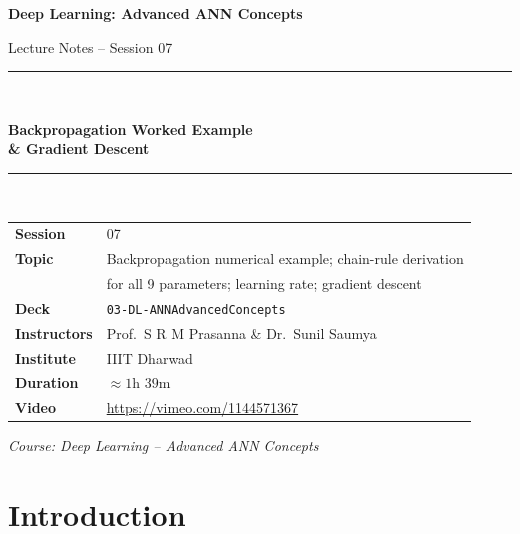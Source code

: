 \documentclass[12pt,a4paper]{article}
\begin{document}
\begin{titlepage}
  \centering
  \vspace*{2cm}
  {\LARGE\bfseries Deep Learning: Advanced ANN Concepts\par}
  \vspace{0.5cm}
  {\large Lecture Notes -- Session 07\par}
  \vspace{1.5cm}
  \rule{\linewidth}{0.5pt}\\[0.4cm]
  {\huge\bfseries Backpropagation Worked Example\\[0.3cm]
   \& Gradient Descent\par}
  \rule{\linewidth}{0.5pt}\\[1.5cm]

  \begin{tabular}{ll}
    \textbf{Session}     & 07 \\[4pt]
    \textbf{Topic}       & Backpropagation numerical example; chain-rule derivation \\
                         & for all 9 parameters; learning rate; gradient descent \\[4pt]
    \textbf{Deck}        & \texttt{03-DL-ANNAdvancedConcepts} \\[4pt]
    \textbf{Instructors} & Prof.\ S R M Prasanna \& Dr.\ Sunil Saumya \\[4pt]
    \textbf{Institute}   & IIIT Dharwad \\[4pt]
    \textbf{Duration}    & $\approx 1$h $39$m \\[4pt]
    \textbf{Video}       & \url{https://vimeo.com/1144571367} \\
  \end{tabular}

  \vfill
  {\large\itshape Course: Deep Learning -- Advanced ANN Concepts\par}
\end{titlepage}

\tableofcontents
\newpage

\section{Introduction}
\label{sec:intro}
\end{document}
